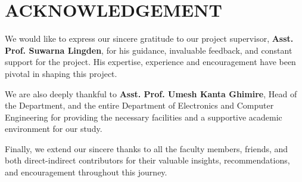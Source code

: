 \chapter*{ACKNOWLEDGEMENT}
{}

We would like to express our sincere gratitude to our project supervisor, \textbf{Asst. Prof.
Suwarna Lingden}, for his guidance, invaluable feedback, and constant support for the project. His expertise, experience and encouragement have been pivotal in shaping this project.

We are also deeply thankful to \textbf{Asst. Prof. Umesh Kanta Ghimire}, Head of the Department, and the entire Department of Electronics and Computer Engineering for
providing the necessary facilities and a supportive academic environment for our study.

Finally, we extend our sincere thanks to all the faculty members, friends, and both direct-indirect contributors for their valuable insights, recommendations, and encouragement throughout this journey.

\vspace{1em}
\noindent \authorTable
